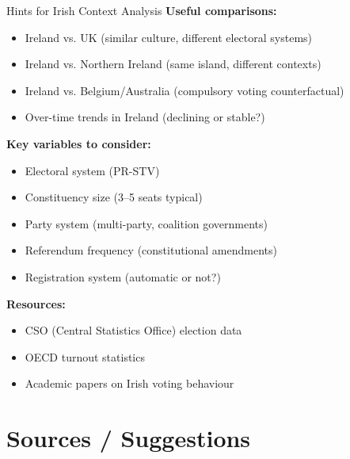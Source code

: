 \documentclass[10pt]{beamer}
\begin{document}
\begin{frame}{Hints for Irish Context Analysis}
\textbf{Useful comparisons:}
\begin{itemize}
\item Ireland vs. UK (similar culture, different electoral systems)
\item Ireland vs. Northern Ireland (same island, different contexts)
\item Ireland vs. Belgium/Australia (compulsory voting counterfactual)
\item Over-time trends in Ireland (declining or stable?)
\end{itemize}



\textbf{Key variables to consider:}
\begin{itemize}
\item Electoral system (PR-STV)
\item Constituency size (3--5 seats typical)
\item Party system (multi-party, coalition governments)
\item Referendum frequency (constitutional amendments)
\item Registration system (automatic or not?)
\end{itemize}



\textbf{Resources:}
\begin{itemize}
\item CSO (Central Statistics Office) election data
\item OECD turnout statistics
\item Academic papers on Irish voting behaviour
\end{itemize}
\end{frame}

\section{Sources / Suggestions}
\end{document}
